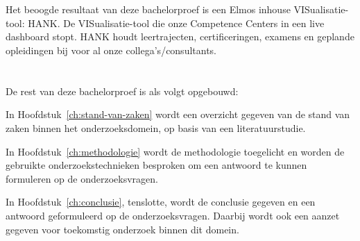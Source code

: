 \section{}%
\label{sec:onderzoeksdoelstelling}


Het beoogde resultaat van deze bachelorproef is een Elmos inhouse
VISualisatie-tool: HANK. De VISualisatie-tool die onze Competence Centers in
een live dashboard stopt. HANK houdt leertrajecten, certificeringen, examens en
geplande opleidingen bij voor al onze collega's/consultants.
\section{}%
\label{sec:opzet-bachelorproef}


De rest van deze bachelorproef is als volgt opgebouwd:

In Hoofdstuk~\ref{ch:stand-van-zaken} wordt een overzicht gegeven van de stand
van zaken binnen het onderzoeksdomein, op basis van een literatuurstudie.

In Hoofdstuk~\ref{ch:methodologie} wordt de methodologie toegelicht en worden
de gebruikte onderzoekstechnieken besproken om een antwoord te kunnen
formuleren op de onderzoeksvragen.


In Hoofdstuk~\ref{ch:conclusie}, tenslotte, wordt de conclusie gegeven en een
antwoord geformuleerd op de onderzoeksvragen. Daarbij wordt ook een aanzet
gegeven voor toekomstig onderzoek binnen dit domein.